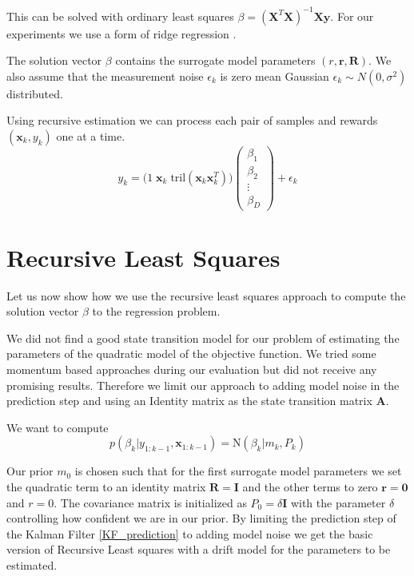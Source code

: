 This can be solved with ordinary least squares
$\beta = (\mathbf{X}^T \mathbf{X})^{-1} \mathbf{X} \mathbf{y}$.
For our experiments we use a form of ridge regression \citep{hoerl1975ridge}.


The solution vector $\beta$ contains the surrogate model parameters
$(r, \mathbf{r}, \mathbf{R})$. We also assume that
the measurement noise $\epsilon_k$ is zero mean Gaussian
$\epsilon_k \sim N(0, \sigma^2)$ distributed.


Using recursive estimation we
can process each pair of samples and rewards $(\mathbf{x}_k, y_k)$ one
at a time.
$$
 y_k =
 \big(1 \;  \mathbf{x}_k \; \text{tril}(\mathbf{x}_k \mathbf{x}_k^T) \big)
\begin{pmatrix}
  \beta_1 \\ \beta_2 \\ \vdots \\ \beta_D
\end{pmatrix} 
+ \epsilon_k
$$

\section{Recursive Least Squares}
Let us now show how we use the recursive least squares approach
to compute the solution vector $\beta$ to the regression problem.

We did not find a good state transition model for our problem of
estimating the parameters of the quadratic model of the objective function.
We tried some momentum based approaches during our evaluation but
did not receive any promising results. Therefore we limit our approach to
adding model noise in the prediction step and
using an Identity matrix as the state transition matrix $\mathbf{A}$.

We want to compute
$$ p(\beta_k | y_{1:k-1}, \mathbf{x}_{1:k-1}) = \text{N}(\beta_k | m_k, P_k) $$

Our prior $m_0$ is chosen such that for the
first surrogate model parameters
we set the quadratic term to an identity matrix $\mathbf{R} = \mathbf{I}$
and the other terms to zero $ \mathbf{r} = \mathbf{0}$ and $ r = 0$.
The covariance matrix is initialized as  $P_0 = \delta \mathbf{I}$ with
the parameter $\delta$ controlling how confident
we are in our prior. By limiting the prediction step of the Kalman Filter
\cref{KF_prediction} to adding model noise we get the basic
version of Recursive Least squares  with a drift model for the
parameters to be estimated.

